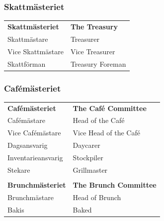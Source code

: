 \documentclass{dsekprotokoll}
\begin{document}
\subsubsection*{Skattmästeriet}
\vspace{12pt}
\begin{center}
    \begin{tabular}{R{6.5cm}|L{6.5cm}}
        \textbf{Skattmästeriet} & \textbf{The Treasury}\\
        Skattmästare & Treasurer\\
        Vice Skattmästare & Vice Treasurer\\
        Skattförman & Treasury Foreman\\
    \end{tabular}
\end{center}

\subsubsection*{Cafémästeriet}
\vspace{12pt}
\begin{center}
    \begin{tabular}{R{6.5cm}|L{6.5cm}}
        \textbf{Cafémästeriet} & \textbf{The Café Committee}\\
        Cafémästare & Head of the Café\\
        Vice Cafémästare & Vice Head of the Café\\
        Dagsansvarig & Daycarer\\
        Inventarieansvarig & Stockpiler \\
        Stekare & Grillmaster \\
        \\

        \textbf{Brunchmästeriet} & \textbf{The Brunch Committee}\\
        Brunchmästare & Head of Brunch \\
        Bakis & Baked \\
    \end{tabular}
\end{center}
\end{document}
